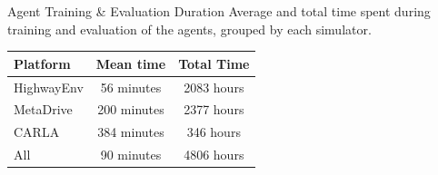 \documentclass[aspectratio=169]{beamer}
\begin{document}
\begin{frame}{Agent Training \& Evaluation Duration}
  Average and total time spent during training and evaluation of the agents, grouped by each simulator.
  \vspace{0.5em}

  \centering
  \begin{tabular}{lcc}
    \toprule
    \textbf{Platform} & \textbf{Mean time} & \textbf{Total Time} \\
    \midrule
    HighwayEnv & 56 minutes & 2083 hours \\
    MetaDrive & 200 minutes & 2377 hours \\
    CARLA & 384 minutes & 346 hours \\
    All & 90 minutes & 4806 hours \\
    \bottomrule
  \end{tabular}
\end{frame}
\end{document}
